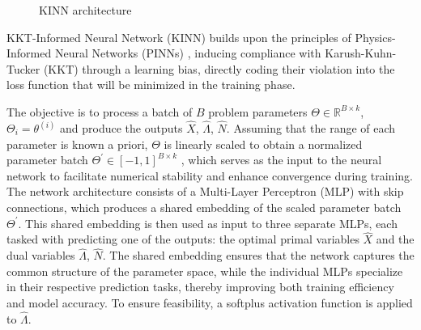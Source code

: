 \documentclass[
]{article}
\begin{document}
\begin{figure}


\caption{\label{fig-architecture}KINN architecture}

\end{figure}%

KKT-Informed Neural Network (KINN) builds upon the principles of
Physics-Informed Neural Networks (PINNs)
\citep{raissiPhysicsinformedNeuralNetworks2019a}, inducing compliance
with Karush-Kuhn-Tucker (KKT) through a learning bias, directly coding
their violation into the loss function that will be minimized in the
training phase.

The objective is to process a batch of \(B\) problem parameters
\(\Theta \in \mathbb{R}^{B \times k}\), \(\Theta_i = \theta^{(i)}\) and
produce the outputs \(\hat{X}\), \(\hat\Lambda\), \(\hat{N}\). Assuming
that the range of each parameter is known a priori, \(\Theta\) is
linearly scaled to obtain a normalized parameter batch
\(\Theta^\prime \in [-1 , 1]^{B \times k}\) , which serves as the input
to the neural network to facilitate numerical stability and enhance
convergence during training. The network architecture consists of a
Multi-Layer Perceptron (MLP) with skip connections, which produces a
shared embedding of the scaled parameter batch \(\Theta^\prime\). This
shared embedding is then used as input to three separate MLPs, each
tasked with predicting one of the outputs: the optimal primal variables
\(\hat{X}\) and the dual variables \(\hat{\Lambda}\), \(\hat{N}\). The
shared embedding ensures that the network captures the common structure
of the parameter space, while the individual MLPs specialize in their
respective prediction tasks, thereby improving both training efficiency
and model accuracy. To ensure feasibility, a softplus activation
function is applied to \(\hat{\Lambda}\).
\end{document}
